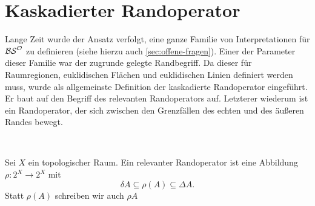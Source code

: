 \section{Kaskadierter Randoperator}\label{sec:kaskadierter-ro}
    Lange Zeit wurde der Ansatz verfolgt, eine ganze Familie von Interpretationen für $\mathcal{BS}^{\mathcal{O}}$ zu definieren (siehe hierzu auch \ref{sec:offene-fragen}).
    Einer der Parameter dieser Familie war der zugrunde gelegte Randbegriff.
    Da dieser für Raumregionen, euklidischen Flächen und euklidischen Linien definiert werden muss, wurde als allgemeinste Definition der kaskadierte Randoperator eingeführt.
    Er baut auf den Begriff des relevanten Randoperators auf.
    Letzterer wiederum ist ein Randoperator, der sich zwischen den Grenzfällen des echten und des äußeren Randes bewegt.
%    
    \begin{dfn}\label{dfn:relevanter-rand} \ \vspace{8pt}

        \noindent
        Sei $X$ ein topologischer Raum.
        Ein relevanter Randoperator ist eine Abbildung $\rho: 2^X \to 2^X$ mit
        $$ \delta A \subseteq \rho(A) \subseteq \Delta A. $$
        Statt $\rho(A)$ schreiben wir auch $\rho A$
    \end{dfn}
%
%
